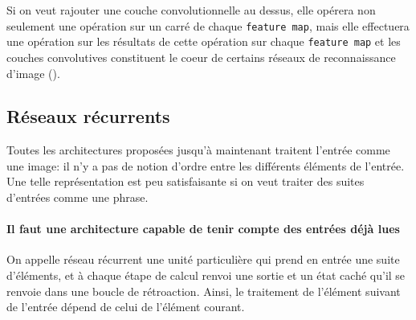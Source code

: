 \documentclass[a4paper, 11pt, onecolumn]{article}
\begin{document}
Si on veut rajouter une couche convolutionnelle au dessus, elle opérera non
seulement une opération sur un carré de chaque \texttt{feature map}, mais elle
effectuera une opération sur les résultats de cette opération sur chaque \texttt{feature
map} et les couches convolutives constituent le coeur de certains réseaux de
reconnaissance d'image (\cite{lecun1998gradient}).





\subsection{Réseaux récurrents}

Toutes les architectures proposées jusqu'à maintenant traitent l'entrée comme
une \og image\fg: il n'y a pas de notion d'ordre entre les différents éléments
de l'entrée. Une telle représentation est peu satisfaisante si on veut traiter
des suites d'entrées comme une phrase.

\paragraph{Il faut une architecture capable de tenir compte des entrées déjà lues}

On appelle réseau récurrent une unité  particulière qui prend en entrée une suite
d'éléments, et à chaque étape de calcul renvoi une sortie et un état caché
qu'il se renvoie dans une boucle de rétroaction. Ainsi, le traitement de
l'élément suivant de l'entrée dépend de celui de l'élément courant.
\end{document}
